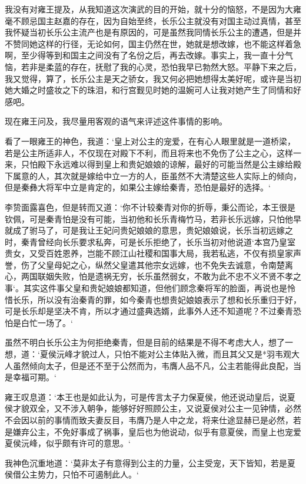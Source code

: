 我没有对雍王提及，从我知道这次演武的目的开始，就十分的恼怒，不是因为大雍毫不顾忌国主赵嘉的存在，因为自始至终，长乐公主就没有对国主动过真情，甚至我怀疑当初长乐公主流产也是有原因的，可是虽然我同情长乐公主的遭遇，但是并不赞同她这样的行径，无论如何，国主仍然在世，她就是想改嫁，也不能这样着急啊，至少得等到和国主之间没有了名份之后，再去改嫁。事实上，我一直十分气恼，若非是柔蓝的存在，抚慰了我的心灵，恐怕我早已勃然大怒。平静下来之后，我又觉得，算了，长乐公主是天之骄女，我又何必把她想得太美好呢，或许是当初她大婚之时盛妆之下的珠泪，和行宫觐见时她的温婉可人让我对她产生了同情和好感吧。

现在雍王问及，我尽量用客观的语气来评述这件事情的影响。

看了一眼雍王的神色，我道：‘皇上对公主的宠爱，在有心人眼里就是一道桥梁，若是公主所适非人，不仅现在对殿下不利，而且将来也不免伤了公主之心，这样一来，只怕殿下永远难以得到皇上和贵妃娘娘的谅解，最好的可能当然是公主嫁给殿下属意的人，其次就是嫁给中立一方的人，臣虽然不大清楚这些人实际上的倾向，但是秦彝大将军中立是肯定的，如果公主嫁给秦青，恐怕是最好的选择。‘

李贽面露喜色，但是转而又道：‘你不计较秦青对你的折辱，秉公而论，本王很是钦佩，可是秦青怕是没有可能，当初他和长乐青梅竹马，若非长乐远嫁，只怕他早就成了驸马了，可是我让王妃问贵妃娘娘的意思，贵妃娘娘说，长乐当初远嫁之时，秦青曾经向长乐要求私奔，可是长乐拒绝了，长乐当初对他说道‘本宫乃皇室贵女，又受百姓恩养，岂能不顾江山社稷和国事大局，我若私逃，不仅有损皇家声誉，伤了父皇母妃之心，纵然父皇遣其他宗女远嫁，也不免失去诚意，令南楚离心，两国联姻失败，怕是遗祸无穷，长乐虽然弱女，不敢为此不忠不义不贤不孝之事‘。其实这件事父皇和贵妃娘娘都知道，但他们顾念秦将军的脸面，再说也是怜惜长乐，所以没有治秦青的罪，如今秦青也想贵妃娘娘表示了想和长乐重归于好，可是长乐却是坚决不肯，所以才通过盛典选婿，此事外人还不知道呢？不过秦青恐怕是白忙一场了。‘

虽然不明白长乐公主为何拒绝秦青，但是目前的结果是不得不考虑大人，想了一想，道：‘夏侯沅峰才貌过人，只怕不能对公主体贴入微，而且其父又是*羽韦观大人虽然倾向太子，但是还不至于公然而为，韦膺人品不凡，公主若能得此良配，当是幸福可期。‘

雍王叹息道：‘本王也是如此认为，可是传言太子力保夏侯，他还说动皇后，说夏侯才貌双全，又不涉入朝争，能够好好照顾公主，又说夏侯对公主一见钟情，必然不会因以前的事情而致夫妻反目，韦膺乃是人中之龙，将来仕途显赫已是必然，若是嫌弃公主，不免好事成了祸事，皇后也为他说动，似乎有意夏侯，而皇上也宠爱夏侯沅峰，似乎颇有许可的意思。‘

我神色沉重地道：‘莫非太子有意得到公主的力量，公主受宠，天下皆知，若是夏侯借公主势力，只怕不可遏制此人。‘

